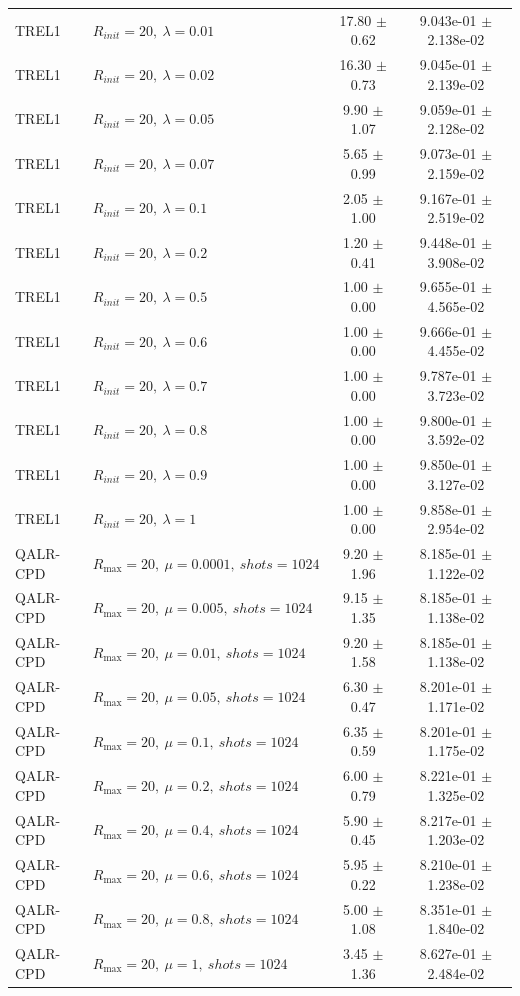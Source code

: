 \begin{table}[t]
\begin{tabular}{@{}llcc@{}}
TREL1 & \(R_{init}=20,\ \lambda=0.01\) & 17.80 $\pm$ 0.62 & 9.043e-01 $\pm$ 2.138e-02 \\
TREL1 & \(R_{init}=20,\ \lambda=0.02\) & 16.30 $\pm$ 0.73 & 9.045e-01 $\pm$ 2.139e-02 \\
TREL1 & \(R_{init}=20,\ \lambda=0.05\) & 9.90 $\pm$ 1.07 & 9.059e-01 $\pm$ 2.128e-02 \\
TREL1 & \(R_{init}=20,\ \lambda=0.07\) & 5.65 $\pm$ 0.99 & 9.073e-01 $\pm$ 2.159e-02 \\
TREL1 & \(R_{init}=20,\ \lambda=0.1\) & 2.05 $\pm$ 1.00 & 9.167e-01 $\pm$ 2.519e-02 \\
TREL1 & \(R_{init}=20,\ \lambda=0.2\) & 1.20 $\pm$ 0.41 & 9.448e-01 $\pm$ 3.908e-02 \\
TREL1 & \(R_{init}=20,\ \lambda=0.5\) & 1.00 $\pm$ 0.00 & 9.655e-01 $\pm$ 4.565e-02 \\
TREL1 & \(R_{init}=20,\ \lambda=0.6\) & 1.00 $\pm$ 0.00 & 9.666e-01 $\pm$ 4.455e-02 \\
TREL1 & \(R_{init}=20,\ \lambda=0.7\) & 1.00 $\pm$ 0.00 & 9.787e-01 $\pm$ 3.723e-02 \\
TREL1 & \(R_{init}=20,\ \lambda=0.8\) & 1.00 $\pm$ 0.00 & 9.800e-01 $\pm$ 3.592e-02 \\
TREL1 & \(R_{init}=20,\ \lambda=0.9\) & 1.00 $\pm$ 0.00 & 9.850e-01 $\pm$ 3.127e-02 \\
TREL1 & \(R_{init}=20,\ \lambda=1\) & 1.00 $\pm$ 0.00 & 9.858e-01 $\pm$ 2.954e-02 \\
QALR-CPD & \(R_{\max}=20,\ \mu=0.0001,\ shots=1024\) & 9.20 $\pm$ 1.96 & 8.185e-01 $\pm$ 1.122e-02 \\
QALR-CPD & \(R_{\max}=20,\ \mu=0.005,\ shots=1024\) & 9.15 $\pm$ 1.35 & 8.185e-01 $\pm$ 1.138e-02 \\
QALR-CPD & \(R_{\max}=20,\ \mu=0.01,\ shots=1024\) & 9.20 $\pm$ 1.58 & 8.185e-01 $\pm$ 1.138e-02 \\
QALR-CPD & \(R_{\max}=20,\ \mu=0.05,\ shots=1024\) & 6.30 $\pm$ 0.47 & 8.201e-01 $\pm$ 1.171e-02 \\
QALR-CPD & \(R_{\max}=20,\ \mu=0.1,\ shots=1024\) & 6.35 $\pm$ 0.59 & 8.201e-01 $\pm$ 1.175e-02 \\
QALR-CPD & \(R_{\max}=20,\ \mu=0.2,\ shots=1024\) & 6.00 $\pm$ 0.79 & 8.221e-01 $\pm$ 1.325e-02 \\
QALR-CPD & \(R_{\max}=20,\ \mu=0.4,\ shots=1024\) & 5.90 $\pm$ 0.45 & 8.217e-01 $\pm$ 1.203e-02 \\
QALR-CPD & \(R_{\max}=20,\ \mu=0.6,\ shots=1024\) & 5.95 $\pm$ 0.22 & 8.210e-01 $\pm$ 1.238e-02 \\
QALR-CPD & \(R_{\max}=20,\ \mu=0.8,\ shots=1024\) & 5.00 $\pm$ 1.08 & 8.351e-01 $\pm$ 1.840e-02 \\
QALR-CPD & \(R_{\max}=20,\ \mu=1,\ shots=1024\) & 3.45 $\pm$ 1.36 & 8.627e-01 $\pm$ 2.484e-02 \\
\bottomrule
\end{tabular}
\end{table}